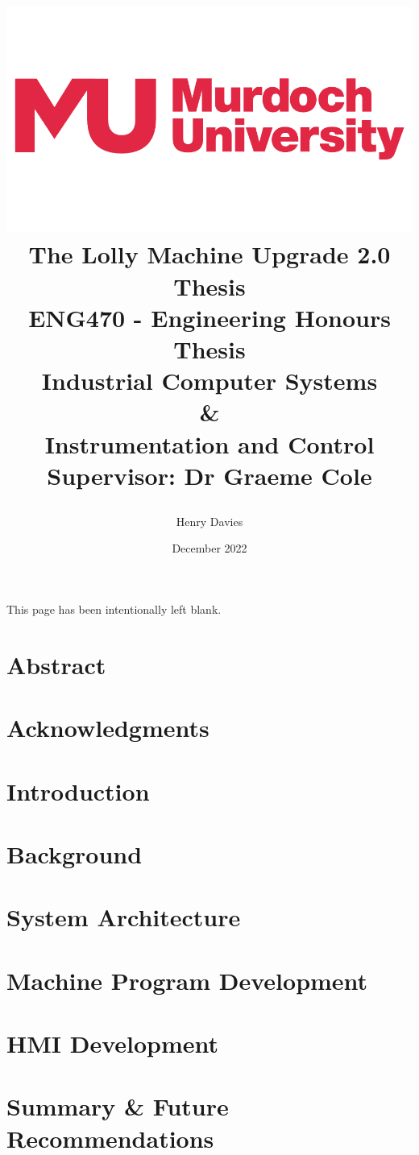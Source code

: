 \documentclass{book}
\title  {\begin{center}
            \includegraphics[scale = 0.2]{murdochLogo} 
            \vspace{10mm}
            \\{\Huge The Lolly Machine Upgrade 2.0}
            \vspace{10mm}
            \\{\Huge Thesis}
            \vspace{5mm}
            \\{\Large ENG470 - Engineering Honours Thesis}
            \vspace{9mm}
           \\{\Large Industrial Computer Systems}
            \\ \&
            \\{\Large Instrumentation and Control}
            \vspace{20mm}
            \\ Supervisor: Dr Graeme Cole
            
        \end{center}}
\author{Henry Davies}
\date{December 2022}
\begin{document}
\frontmatter

\maketitle
\newpage
This page has been intentionally left blank.

\chapter*{Abstract}


\chapter*{Acknowledgments}



\tableofcontents
{}
\newpage

\listoffigures
{}
\newpage

\printglossary[type=\acronymtype]
\newpage

\mainmatter
\pagestyle{plain}

\chapter{Introduction}
    \label{chap:intro}
    
    \newpage

\chapter{Background}
    \label{chap:background}
    
    \newpage

\chapter{System Architecture}
    \label{chap:sysArch}
    
    \newpage
    
\chapter{Machine Program Development}
    \label{chap:plc}
    
    \newpage  
    
\chapter{HMI Development}
    \label{chap:hmi}
    
    \newpage
    
\chapter{Summary \& Future Recommendations}
    \label{chap:summary}
    
    \newpage
    
\printbibliography
\end{document}
